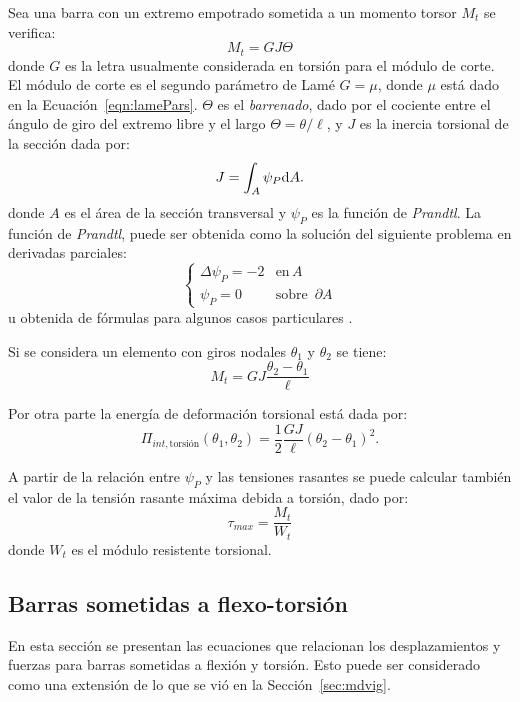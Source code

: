 Sea una barra con un extremo empotrado sometida a un momento torsor $M_t$ se verifica:
%
\begin{equation}
M_t = G J \Theta
\end{equation}
%
donde $G$ es la letra usualmente considerada en torsión para el módulo de corte. %
%
El módulo de corte es el segundo parámetro de Lamé $G=\mu$, donde $\mu$ está dado en la Ecuación~\eqref{eqn:lamePars}. %
%
$\Theta$ es el \textit{barrenado}, dado por el cociente entre el ángulo de giro del extremo libre y el largo  $\Theta = \theta / \ell$, y $J$ es la inercia torsional de la sección dada por:
%
\begin{equation}
J = \int_{A} \psi_P {\text{d}} A.
\end{equation}
%
donde $A$ es el área de la sección transversal y $\psi_P$ es la función de \emph{Prandtl}. %
%
La función de \emph{Prandtl}, puede ser obtenida como la solución del siguiente problema en derivadas parciales:
%
\begin{equation}
\left\{
\begin{array}{lr}
\Delta \psi_P = -2 & \text{en} \, A\\
\psi_P = 0 & \text{sobre } \, \partial A
\end{array}
\right.
\end{equation} 
%
u obtenida de fórmulas para algunos casos particulares \citep{Young2001}.


Si se considera un elemento con giros nodales $\theta_1$ y $\theta_2$ se tiene:
%
\begin{equation}
  M_t = G J \frac{\theta_2 - \theta_1}{\ell}
\end{equation}

Por otra parte la energía de deformación torsional está dada por:
%
\begin{equation}
\Pi_{int,\text{torsión}}(\theta_1,\theta_2) = \frac{1}{2} \frac{G J}{\ell} \left( \theta_2 - \theta_1\right)^2.
\end{equation}
%

A partir de la relación entre $\psi_P$ y las tensiones rasantes se puede calcular también el valor de la tensión rasante máxima debida a torsión, dado por:
%
\begin{equation}
\tau_{max} = \frac{M_t}{W_t}
\end{equation}
%
donde $W_t$ es el módulo resistente torsional.


\subsection{Barras sometidas a flexo-torsión}
%
En esta sección se presentan las ecuaciones que relacionan los desplazamientos y fuerzas para barras sometidas a flexión y torsión. %
%
Esto puede ser considerado como una extensión de lo que se vió en la Sección~\ref{sec:mdvig}. %

